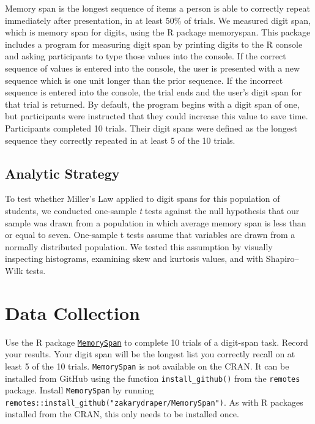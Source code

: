 \documentclass[
]{book}
\begin{document}
Memory span is the longest sequence of items a person is able to correctly repeat immediately after presentation, in at least 50\% of trials. We measured digit span, which is memory span for digits, using the R package memoryspan. This package includes a program for measuring digit span by printing digits to the R console and asking participants to type those values into the console. If the correct sequence of values is entered into the console, the user is presented with a new sequence which is one unit longer than the prior sequence. If the incorrect sequence is entered into the console, the trial ends and the user's digit span for that trial is returned. By default, the program begins with a digit span of one, but participants were instructed that they could increase this value to save time. Participants completed 10 trials. Their digit spans were defined as the longest sequence they correctly repeated in at least 5 of the 10 trials.

\hypertarget{analytic-strategy}{%
\subsection*{Analytic Strategy}\label{analytic-strategy}}

To test whether Miller's Law applied to digit spans for this population of students, we conducted one-sample \emph{t} tests against the null hypothesis that our sample was drawn from a population in which average memory span is less than or equal to seven. One-sample t tests assume that variables are drawn from a normally distributed population. We tested this assumption by visually inspecting histograms, examining skew and kurtosis values, and with Shapiro--Wilk tests.

\hypertarget{ost-data-collection}{%
\section{Data Collection}\label{ost-data-collection}}

Use the R package \href{http://github.com/zakarydraper/MemorySpan}{\texttt{MemorySpan}} to complete 10 trials of a digit-span task. Record your results. Your digit span will be the longest list you correctly recall on at least 5 of the 10 trials. \texttt{MemorySpan} is not available on the CRAN. It can be installed from GitHub using the function \texttt{install\_github()} from the \texttt{remotes} package. Install \texttt{MemorySpan} by running \texttt{remotes::install\_github("zakarydraper/MemorySpan")}. As with R packages installed from the CRAN, this only needs to be installed once.
\end{document}

